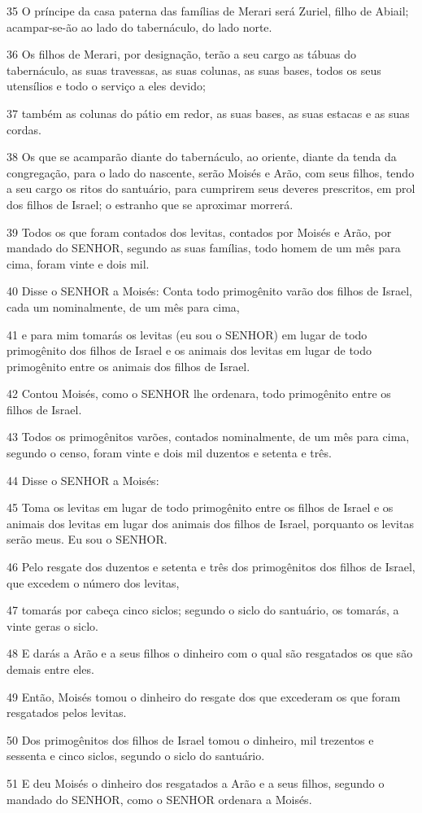 \par 35 O príncipe da casa paterna das famílias de Merari será Zuriel, filho de Abiail; acampar-se-ão ao lado do tabernáculo, do lado norte.
\par 36 Os filhos de Merari, por designação, terão a seu cargo as tábuas do tabernáculo, as suas travessas, as suas colunas, as suas bases, todos os seus utensílios e todo o serviço a eles devido;
\par 37 também as colunas do pátio em redor, as suas bases, as suas estacas e as suas cordas.
\par 38 Os que se acamparão diante do tabernáculo, ao oriente, diante da tenda da congregação, para o lado do nascente, serão Moisés e Arão, com seus filhos, tendo a seu cargo os ritos do santuário, para cumprirem seus deveres prescritos, em prol dos filhos de Israel; o estranho que se aproximar morrerá.
\par 39 Todos os que foram contados dos levitas, contados por Moisés e Arão, por mandado do SENHOR, segundo as suas famílias, todo homem de um mês para cima, foram vinte e dois mil.
\par 40 Disse o SENHOR a Moisés: Conta todo primogênito varão dos filhos de Israel, cada um nominalmente, de um mês para cima,
\par 41 e para mim tomarás os levitas (eu sou o SENHOR) em lugar de todo primogênito dos filhos de Israel e os animais dos levitas em lugar de todo primogênito entre os animais dos filhos de Israel.
\par 42 Contou Moisés, como o SENHOR lhe ordenara, todo primogênito entre os filhos de Israel.
\par 43 Todos os primogênitos varões, contados nominalmente, de um mês para cima, segundo o censo, foram vinte e dois mil duzentos e setenta e três.
\par 44 Disse o SENHOR a Moisés:
\par 45 Toma os levitas em lugar de todo primogênito entre os filhos de Israel e os animais dos levitas em lugar dos animais dos filhos de Israel, porquanto os levitas serão meus. Eu sou o SENHOR.
\par 46 Pelo resgate dos duzentos e setenta e três dos primogênitos dos filhos de Israel, que excedem o número dos levitas,
\par 47 tomarás por cabeça cinco siclos; segundo o siclo do santuário, os tomarás, a vinte geras o siclo.
\par 48 E darás a Arão e a seus filhos o dinheiro com o qual são resgatados os que são demais entre eles.
\par 49 Então, Moisés tomou o dinheiro do resgate dos que excederam os que foram resgatados pelos levitas.
\par 50 Dos primogênitos dos filhos de Israel tomou o dinheiro, mil trezentos e sessenta e cinco siclos, segundo o siclo do santuário.
\par 51 E deu Moisés o dinheiro dos resgatados a Arão e a seus filhos, segundo o mandado do SENHOR, como o SENHOR ordenara a Moisés.

